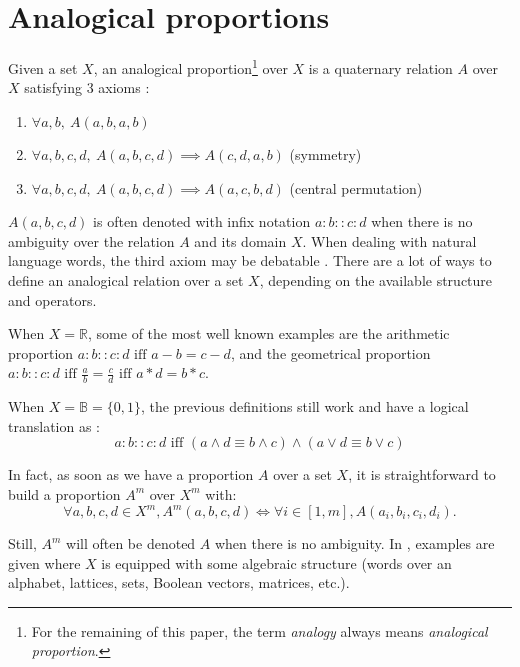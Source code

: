 \documentclass{ecai}
\begin{document}
\section{Analogical proportions}\label{analogy}
Given a set $X$, an analogical proportion\footnote{For the remaining of this
paper, the term {\it analogy} always means {\it analogical proportion}.} over
$X$ is a quaternary relation $A$ over $X$ satisfying 3 axioms \cite{Dorolle49,LepageHDR2003}:
\begin{enumerate}
\item $\forall a, b, ~ A(a,b,a,b)$
\item $\forall a, b, c, d, ~ A(a,b,c,d) \implies
  A(c,d,a,b)$ (symmetry)
\item $\forall a, b, c, d, ~ A(a,b,c,d) \implies
  A(a,c,b,d)$ (central permutation)
\end{enumerate}
$A(a,b,c, d)$ is often denoted with infix notation $a:b::c:d$  when there is no ambiguity over the
relation $A$ and its domain $X$. When dealing with natural language words, the
third axiom may be debatable \cite{BayPraRicKBS12}. There are a lot of ways to define an
analogical relation over a set $X$, depending on the available structure and
operators.

When $X = \mathbb{R}$, some of the most well known examples are the arithmetic
proportion $a:b::c:d \mbox{ iff } a-b=c-d$, and the geometrical proportion
$a:b::c:d \mbox{ iff } \frac{a}{b}=\frac{c}{d}  \mbox{ iff } a*d = b*c$.

When $X=\mathbb{B}=\{0,1\}$, the previous definitions still work
and have a logical translation as \cite{MicPraECSQARU2009,PraRicLU2013}:
$$a:b::c:d \mbox{ iff } (a \wedge d \equiv b
  \wedge c) \wedge (a \vee  d \equiv b \vee c)$$

In fact, as soon as we have a proportion $A$
over a set $X$, it is straightforward to build a proportion $A^m$ over $X^m$
with:
$$\forall a, b, c, d \in X^m, A^m(a, b, c, d) \iff \forall i \in [1, m], A(a_i,
b_i, c_i, d_i).$$

Still, $A^m$ will often be denoted $A$ when there is no ambiguity.
In \cite{MicDelIRISA2004,StrYvoReport2005,MicBayDelJAIR2008}, examples
are given where $X$ is equipped with some algebraic structure (words over an alphabet,
lattices, sets, Boolean vectors, matrices, etc.).

\end{document}
